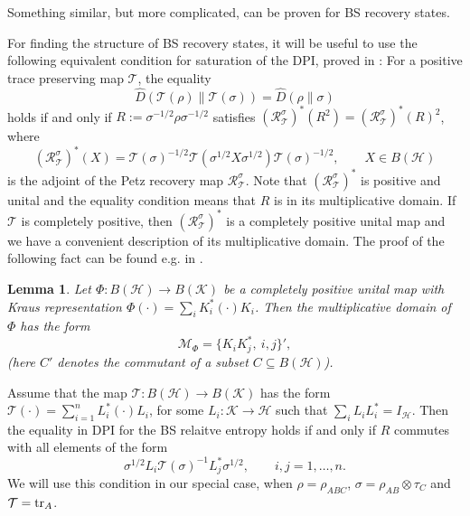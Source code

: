 \documentclass[11pt]{article}
\theoremstyle{newdefinition}
\theoremstyle{newplain}
\newtheorem{lemma}[definition]{Lemma}
\theoremstyle{myplain}
\DeclareMathOperator{\1}{\mathds{1}}
\begin{document}
Something similar, but more complicated, can be proven for BS recovery states. %
{
For finding the structure of BS recovery states, it will be useful to use the following equivalent  condition for
saturation of the DPI, proved in  \cite[Thm. 3.34(h)]{HiaiMosonyi-f-divergences-2017}: For a positive
trace preserving map $\mathcal {T}$, the equality
\[
\hat D(\mathcal {T}(\rho)\|\mathcal {T}(\sigma))=\hat D(\rho\|\sigma)
\]
holds if and only if $R:=\sigma^{-1/2}\rho\sigma^{-1/2}$ satisfies
$(\mathcal{R}_{\mathcal {T}}^\sigma)^*(R^2)=(\mathcal {R}_{\mathcal {T}}^\sigma)^*(R)^2$, where
\[
(\mathcal{R}_{\mathcal {T}}^\sigma)^*(X)=\mathcal {T}(\sigma)^{-1/2}\mathcal
{T}(\sigma^{1/2}X\sigma^{1/2})\mathcal {T}(\sigma)^{-1/2},\qquad
X\in B(\mathcal {H})
\]
is the adjoint of the Petz recovery map $\mathcal {R}_{\mathcal T}^\sigma$.  Note that
$(\mathcal {R}_{\mathcal T}^\sigma)^*$ is  positive
and unital and the equality condition means that $R$ is in its multiplicative domain. If
$\mathcal {T}$ is completely positive, then $(\mathcal {R}_{\mathcal T}^\sigma)^*$ is a
completely positive unital map and we have a convenient description of its multiplicative
domain. The proof of the following fact can be found e.g. in \cite[Proposition 2]{carbone2020onperiod}.

\begin{lemma}\label{lemma:multiplicative} Let $\Phi:B(\mathcal {H})\to B(\mathcal {K})$ be a completely positive unital map with Kraus
representation $\Phi(\cdot)=\sum_i K_i^* (\cdot) K_i$. Then the multiplicative domain of
$\Phi$ has the form
\[
\mathcal {M}_\Phi=\{K_iK_j^*,\ i,j\}',
\]
(here $C'$ denotes the commutant of a subset $C\subseteq B(\mathcal {H})$).
\end{lemma}

Assume that the map $\mathcal {T}: B(\mathcal {H})\to B(\mathcal {K})$ has the form
$\mathcal {T}(\cdot)=\sum_{i=1}^n L_i^*(\cdot)L_i$, for some $L_i:\mathcal {K}\to \mathcal
{H}$ such that
$\sum_iL_iL_i^*=I_{\mathcal {H}}$. Then the equality in DPI for the BS relaitve entropy holds if and only if $R$ commutes
with all elements of the form 
\[
\sigma^{1/2}L_i\mathcal {T}(\sigma)^{-1}L_j^*\sigma^{1/2},\qquad i,j=1,\dots,n.
\]
We will use this condition in our special case, when $\rho=\rho_{ABC}$, $\sigma=\rho_{AB}\otimes
\tau_C$ and $\mathcal {T}=\tr_A$.





}
\end{document}
